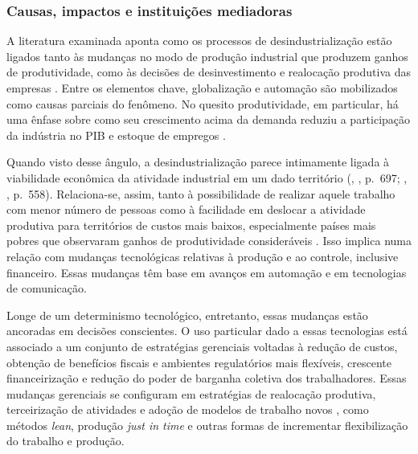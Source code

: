 \subsubsection{Causas, impactos e instituições mediadoras}

A literatura examinada aponta como os processos de desindustrialização
estão ligados tanto às mudanças no modo de produção industrial que
produzem ganhos de produtividade, como às decisões de desinvestimento e
realocação produtiva das empresas
\citep{kollmeyer_explaining_2009,kollmeyer_trade_2018}. Entre os elementos chave, globalização
\citep{alderson_explaining_1999,alderson_globalization_2002} e automação
\citep{berger_industrial_2022} são mobilizados como causas parciais do fenômeno. No quesito
produtividade, em particular, há uma ênfase sobre como seu crescimento
acima da demanda reduziu a participação da indústria no PIB e estoque de
empregos \citep{rodrik_premature_2016}.

Quando visto desse ângulo, a desindustrialização parece intimamente
ligada à viabilidade econômica da atividade industrial em um dado
território (\citeauthor{hoekstra_iconic_2020}, \citeyear{hoekstra_iconic_2020}, p.~697; \citeauthor{phillips_closure_2015}, \citeyear{phillips_closure_2015}, p.~558). Relaciona-se, assim, tanto à
possibilidade de realizar aquele trabalho com menor número de pessoas
como à facilidade em deslocar a atividade produtiva para territórios de
custos mais baixos, especialmente países mais pobres que observaram
ganhos de produtividade consideráveis
\citep{tomlinson_-industrialization_2016}.
Isso implica numa relação com mudanças tecnológicas relativas à produção
e ao controle, inclusive financeiro. Essas mudanças têm base em avanços
em automação \citep{berger_industrial_2022} e em tecnologias de comunicação.

Longe de um determinismo tecnológico, entretanto, essas mudanças estão
ancoradas em decisões conscientes. O uso particular dado a essas
tecnologias está associado a um conjunto de estratégias gerenciais
voltadas à redução de custos, obtenção de benefícios fiscais e ambientes
regulatórios mais flexíveis, crescente financeirização e redução do
poder de barganha coletiva dos trabalhadores. Essas mudanças gerenciais
se configuram em estratégias de realocação produtiva, terceirização de
atividades e adoção de modelos de trabalho novos
\citep{kollmeyer_explaining_2009,kollmeyer_trade_2018}, como métodos \emph{lean}, produção \emph{just in time} e outras
formas de incrementar flexibilização do trabalho e produção.

